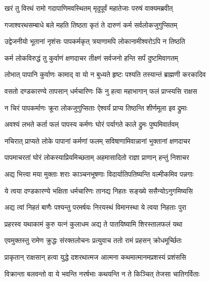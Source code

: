 
\twolineshloka
{खरं तु विरथं रामो गदापाणिमवस्थितम्}
{मृदुपूर्वं महातेजाः परुषं वाक्यमब्रवीत्} %

\twolineshloka
{गजाश्वरथसम्बाधे बले महति तिष्ठता}
{कृतं ते दारुणं कर्म सर्वलोकजुगुप्सितम्} %

\twolineshloka
{उद्वेजनीयो भूतानां नृशंसः पापकर्मकृत्}
{त्रयाणामपि लोकानामीश्वरोऽपि न तिष्ठति} %

\twolineshloka
{कर्म लोकविरुद्धं तु कुर्वाणं क्षणदाचर}
{तीक्ष्णं सर्वजनो हन्ति सर्पं दुष्टमिवागतम्} %

\twolineshloka
{लोभात् पापानि कुर्वाणः कामाद् वा यो न बुध्यते}
{हृष्टः पश्यति तस्यान्तं ब्राह्मणी करकादिव} %

\twolineshloka
{वसतो दण्डकारण्ये तापसान् धर्मचारिणः}
{किं नु हत्वा महाभागान् फलं प्राप्स्यसि राक्षस} %

\twolineshloka
{न चिरं पापकर्माणः क्रूरा लोकजुगुप्सिताः}
{ऐश्वर्यं प्राप्य तिष्ठन्ति शीर्णमूला इव द्रुमाः} %

\twolineshloka
{अवश्यं लभते कर्ता फलं पापस्य कर्मणः}
{घोरं पर्यागते काले द्रुमः पुष्पमिवार्तवम्} %

\twolineshloka
{नचिरात् प्राप्यते लोके पापानां कर्मणां फलम्}
{सविषाणामिवान्नानां भुक्तानां क्षणदाचर} %

\twolineshloka
{पापमाचरतां घोरं लोकस्याप्रियमिच्छताम्}
{अहमासादितो राज्ञा प्राणान् हन्तुं निशाचर} %

\twolineshloka
{अद्य भित्त्वा मया मुक्ताः शराः काञ्चनभूषणाः}
{विदार्यातिपतिष्यन्ति वल्मीकमिव पन्नगाः} %

\twolineshloka
{ये त्वया दण्डकारण्ये भक्षिता धर्मचारिणः}
{तानद्य निहतः सङ्ख्ये ससैन्योऽनुगमिष्यसि} %

\twolineshloka
{अद्य त्वां निहतं बाणैः पश्यन्तु परमर्षयः}
{निरयस्थं विमानस्था ये त्वया निहताः पुरा} %

\twolineshloka
{प्रहरस्व यथाकामं कुरु यत्नं कुलाधम}
{अद्य ते पातयिष्यामि शिरस्तालफलं यथा} %

\twolineshloka
{एवमुक्तस्तु रामेण क्रुद्धः संरक्तलोचनः}
{प्रत्युवाच ततो रामं प्रहसन् क्रोधमूर्च्छितः} %

\twolineshloka
{प्राकृतान् राक्षसान् हत्वा युद्धे दशरथात्मज}
{आत्मना कथमात्मानमप्रशस्यं प्रशंससि} %

\twolineshloka
{विक्रान्ता बलवन्तो वा ये भवन्ति नरर्षभाः}
{कथयन्ति न ते किञ्चित् तेजसा चातिगर्विताः} %

